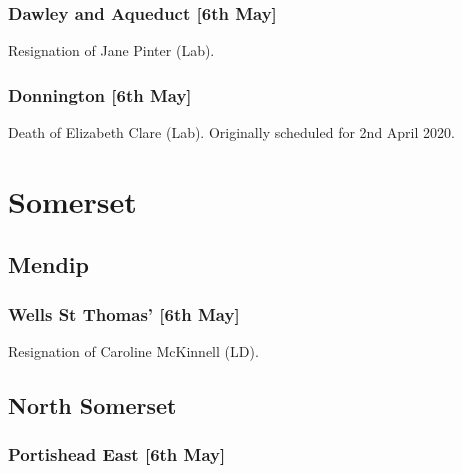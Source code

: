 \documentclass[a4paper,openany]{book}
\begin{document}
\begin{resultsiii}
\subsubsection*{Dawley and Aqueduct \hspace*{\fill}\nolinebreak[1]%
	\enspace\hspace*{\fill}
	[6th May]}


Resignation of Jane Pinter (Lab).

\subsubsection*{Donnington \hspace*{\fill}\nolinebreak[1]%
	\enspace\hspace*{\fill}
	[6th May]}


Death of Elizabeth Clare (Lab).  Originally scheduled for 2nd April 2020.

\section{Somerset}

\subsection*{Mendip}

\subsubsection*{Wells St Thomas' \hspace*{\fill}\nolinebreak[1]%
	\enspace\hspace*{\fill}
	[6th May]}


Resignation of Caroline McKinnell (LD).

\subsection*{North Somerset}

\subsubsection*{Portishead East \hspace*{\fill}\nolinebreak[1]%
	\enspace\hspace*{\fill}
	[6th May]}


\end{resultsiii}
\end{document}
